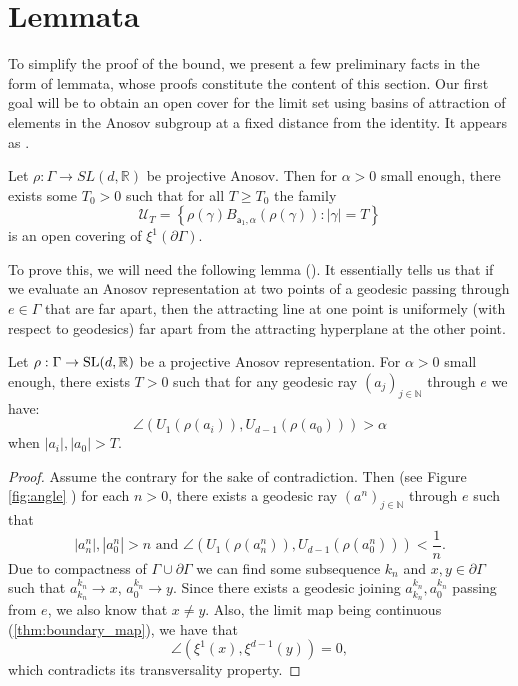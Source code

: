 \documentclass{report}
\begin{document}
\section{Lemmata}
To simplify the proof of the bound, we present a few preliminary facts in the form of lemmata, whose proofs constitute the content of this section.
Our first goal will be to obtain an open cover for the limit set using basins of attraction of elements in the Anosov subgroup at a fixed distance from the identity.
It appears as \cite[Proposition 3.5]{pozzetti_anosov_2023}.
\begin{lemma}\label{lem:boundary_covering}
Let $\rho: \Gamma \to SL(d, \mathbb R)$ be projective Anosov.
Then for $\alpha > 0$ small enough, there exists some $T_0 > 0$ such that for all $T \geq T_0$ the family
\[
    \mathcal U_T = \left\{ \rho(\gamma) B_{\mathsf{a}_1, \alpha}(\rho(\gamma)) : |\gamma| = T \right\}
\]
is an open covering of $\xi^1(\partial \Gamma)$.
\end{lemma}
To prove this, we will need the following lemma (\cite[Lemma 2.4]{pozzetti_anosov_2023}).
It essentially tells us that if we evaluate an Anosov representation at two points of a geodesic passing through $e \in \Gamma$ that are far apart, then the attracting line at one point is uniformely (with respect to geodesics) far apart from the attracting hyperplane at the other point.
\begin{lemma}\label{lem:angle}
    Let $\rho: \Gamma \to \operatorname{{\mathrm{SL}}}(d, \mathbb R)$ be a projective Anosov representation.
    For $\alpha > 0$ small enough, there exists $T>0$ such that for any geodesic ray $(a_j)_{j \in \mathbb N}$ through $e$ we have:
    \[
        \angle(U_1(\rho(a_i)), U_{d-1}(\rho(a_0))) > \alpha
    \]
    when $|a_i|, |a_0| > T$.
\end{lemma}
\begin{proof}
Assume the contrary for the sake of contradiction.
Then (see Figure \ref{fig:angle} ) for each $n>0$, there exists a geodesic ray  $(a^n)_{j \in \mathbb N}$ through $e$ such that 
\[
    |a_n^n|, |a_0^n| > n \text{ and }
    \angle(U_1(\rho(a_n^n)), U_{d-1}(\rho(a_0^n))) < \frac{1}{n}.
\]
Due to compactness of $\Gamma \cup \partial \Gamma$ we can find some subsequence  ${k_n}$ and $x,y \in \partial \Gamma$ such that $a^{k_n}_{k_n} \to x$, $a^{k_n}_0 \to y$.
Since there exists a geodesic joining $a_{k_n}^{k_n}, a_0^{k_n}$ passing from $e$, we also know that $x\neq y$.
Also, the limit map being continuous (\cref{thm:boundary_map}), we have that
\[
    \angle (\xi^1(x), \xi^{d-1}(y)) = 0,
\]
which contradicts its transversality property.
\end{proof}
\end{document}
